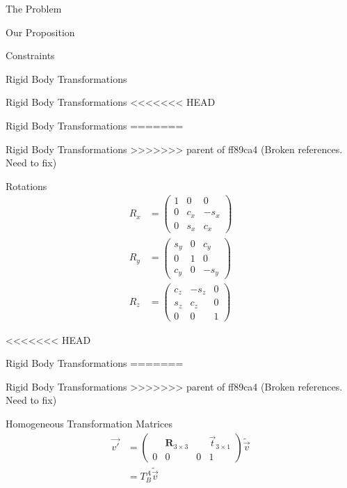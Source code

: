 \documentclass[presentation, aspectratio=1610]{beamer}
\begin{document}
\begin{frame}[label={sec:org51bdd62}]{The Problem}
\begin{frame}[label={sec:org827823c}]{Our Proposition}
\begin{frame}[label={sec:org8655799}]{Constraints}
\begin{frame}[label={sec:orgb624cd0}]{Rigid Body Transformations}
\begin{frame}[label={sec:org66cfa5c}]{Rigid Body Transformations}
<<<<<<< HEAD
\begin{frame}[label={sec:orga8040ec}]{Rigid Body Transformations}
=======
\begin{frame}[label={sec:org3796a38}]{Rigid Body Transformations}
>>>>>>> parent of ff89ca4 (Broken references. Need to fix)
\begin{block}{Rotations}
\begin{equation*}
  \begin{aligned}
    R_{x} & =
            \begin{pmatrix}
              1 & 0 & 0 \\
              0 & c_{x} & -s_{x}\\
              0 & s_{x} & c_{x}
            \end{pmatrix} \\
    R_{y} &=
            \begin{pmatrix}
              s_{y} & 0 & c_{y}\\
              0 & 1 & 0 \\
              c_{y} & 0 & -s_{y}
            \end{pmatrix} \\
    R_{z} &=
            \begin{pmatrix}
              c_{z} & -s_{z} & 0 \\
              s_{z} & c_{z} & 0 \\
              0 & 0 & 1
            \end{pmatrix}
  \end{aligned}
\end{equation*}
\end{block}
\end{frame}

<<<<<<< HEAD
\begin{frame}[label={sec:org2c45bb0}]{Rigid Body Transformations}
=======
\begin{frame}[label={sec:org3238a6c}]{Rigid Body Transformations}
>>>>>>> parent of ff89ca4 (Broken references. Need to fix)
\begin{block}{Homogeneous Transformation Matrices}
\begin{equation*}
  \begin{aligned}
  \vec{v'} &=
  \begin{pmatrix}
    & \mathbf{R}_{3 \times 3} & & \vec{t}_{3 \times 1} \\
    0 & 0 & 0 & 1
  \end{pmatrix}\tilde{\vec{v}} \\
    &= T^{A}_{B} \tilde{\vec{v}}
  \end{aligned}
\end{equation*}


\end{block}
\end{frame}
\end{frame}
\end{frame}
\end{frame}
\end{frame}
\end{frame}
\end{frame}
\end{frame}
\end{document}
